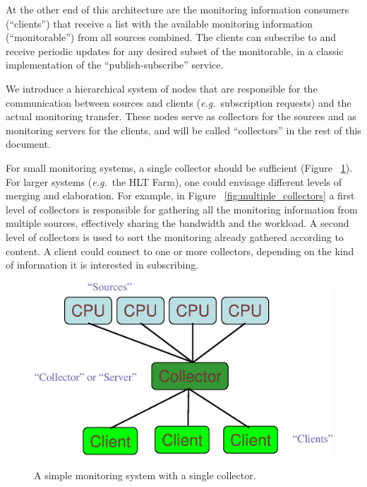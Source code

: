 \documentclass{cmspaper}
\newcommand {\eg}{\mbox{\sl e.g. }}     %
\begin{document}
At the other end of this architecture are the monitoring information
consumers (``clients'') that receive a list with the available monitoring
information (``monitorable'') from all sources combined. The clients can
subscribe to and receive periodic updates for any desired subset of the
monitorable, in a classic implementation of the ``publish-subscribe'' service.

We introduce a hierarchical system of nodes that are responsible for
the communication between sources and clients (\eg subscription
requests) and the actual monitoring transfer. These nodes serve as
collectors for the sources and as monitoring servers for the clients,
and will be called ``collectors'' in the rest of this document.

For small monitoring systems, a single collector should be
sufficient (Figure ~\ref{fig:single_collector}). For larger systems
(\eg the HLT Farm), one could envisage different levels of merging
and elaboration. For example, in Figure ~\ref{fig:multiple_collectors}
a first level of collectors is responsible for gathering all the
monitoring information from multiple sources, effectively sharing the
bandwidth and the workload. A second level of collectors is used to
sort the monitoring already gathered according to content. A client
could connect to one or more collectors, depending on the kind of
information it is interested in subscribing.
%
\begin{figure}[hbtp]
  \begin{center}
    \resizebox{10cm}{!}
	{\includegraphics{figures/single_collector.eps}} 
\caption{A simple monitoring system with a single collector.}
\label{fig:single_collector}
  \end{center}
\end{figure}
%
\end{document}
